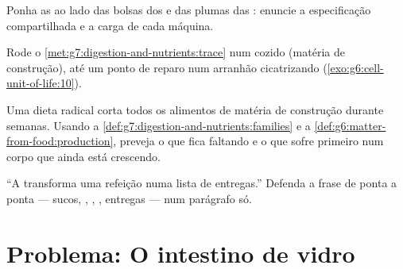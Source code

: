 \begin{exercise}[$\star\star$]\label{exo:g7:digestion-and-nutrients:9}
Ponha as  ao lado das bolsas dos  e das plumas das
: enuncie a especificação compartilhada e a carga de cada
máquina.
\end{exercise}

\begin{exercise}[$\star\star$]\label{exo:g7:digestion-and-nutrients:10}
Rode o \cref{met:g7:digestion-and-nutrients:trace} num  cozido
(matéria de construção), até um ponto de reparo num arranhão
cicatrizando (\cref{exo:g6:cell-unit-of-life:10}).
\end{exercise}

\begin{exercise}[$\star\star$]\label{exo:g7:digestion-and-nutrients:11}
Uma dieta radical corta todos os alimentos de matéria de construção
durante semanas. Usando a \cref{def:g7:digestion-and-nutrients:families}
e a \cref{def:g6:matter-from-food:production}, preveja o que fica
faltando e o que sofre primeiro num corpo que ainda está crescendo.
\end{exercise}

\begin{exercise}[$\star\star\star$]\label{exo:g7:digestion-and-nutrients:12}
``A  transforma uma refeição numa lista de entregas.'' Defenda
a frase de ponta a ponta --- sucos, , , ,
entregas --- num parágrafo só.
\end{exercise}

\section{Problema: O intestino de vidro}

